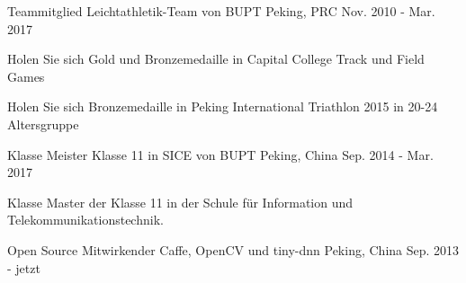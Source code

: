 


\begin{cventries}


\cventry
{Teammitglied} %
{Leichtathletik-Team von BUPT} %
{Peking, PRC} %
{Nov. 2010 - Mar. 2017} %
{ %
\begin{cvitems}
\item {Holen Sie sich Gold und Bronzemedaille in Capital College Track und Field Games}
\item {Holen Sie sich Bronzemedaille in Peking International Triathlon 2015 in 20-24 Altersgruppe}
\end{cvitems}
}

\cventry
{Klasse Meister} %
{Klasse 11 in SICE von BUPT} %
{Peking, China} %
{Sep. 2014 - Mar. 2017} %
{ %
\begin{cvitems}
\item {Klasse Master der Klasse 11 in der Schule für Information und Telekommunikationstechnik.}
\end{cvitems}
}

\cventry
{Open Source Mitwirkender} %
{Caffe, OpenCV und tiny-dnn} %
{Peking, China} %
{Sep. 2013 - jetzt} %
{ %
}


\end{cventries}
